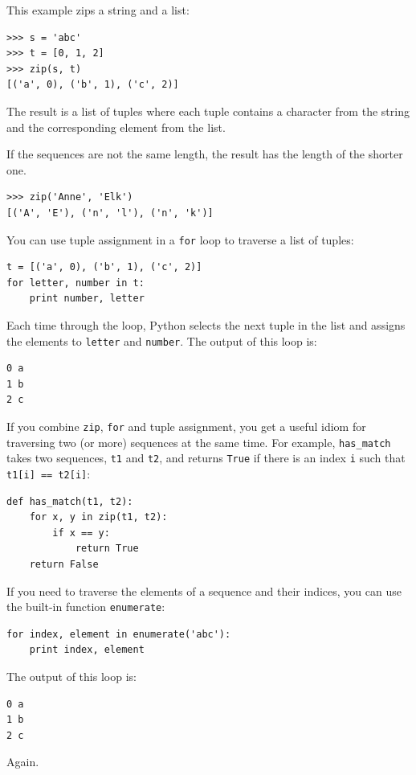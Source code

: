 \documentclass[10pt]{book}
\begin{document}
\begin{CJK}{UTF8}{gbsn}
This example zips a string and a list:

\begin{verbatim}
>>> s = 'abc'
>>> t = [0, 1, 2]
>>> zip(s, t)
[('a', 0), ('b', 1), ('c', 2)]
\end{verbatim}
%
The result is a list of tuples where each tuple contains
a character from the string and the corresponding element from
the list.

If the sequences are not the same length, the result has the
length of the shorter one.

\begin{verbatim}
>>> zip('Anne', 'Elk')
[('A', 'E'), ('n', 'l'), ('n', 'k')]
\end{verbatim}
%
You can use tuple assignment in a {\tt for} loop to traverse a list of
tuples:

\begin{verbatim}
t = [('a', 0), ('b', 1), ('c', 2)]
for letter, number in t:
    print number, letter
\end{verbatim}
%
Each time through the loop, Python selects the next tuple in
the list and assigns the elements to {\tt letter} and 
{\tt number}.  The output of this loop is:

\begin{verbatim}
0 a
1 b
2 c
\end{verbatim}
%
If you combine {\tt zip}, {\tt for} and tuple assignment, you get a
useful idiom for traversing two (or more) sequences at the same
time.  For example, \verb"has_match" takes two sequences, {\tt t1} and
{\tt t2}, and returns {\tt True} if there is an index {\tt i}
such that {\tt t1[i] == t2[i]}:

\begin{verbatim}
def has_match(t1, t2):
    for x, y in zip(t1, t2):
        if x == y:
            return True
    return False
\end{verbatim}
%
If you need to traverse the elements of a sequence and their
indices, you can use the built-in function {\tt enumerate}:

\begin{verbatim}
for index, element in enumerate('abc'):
    print index, element
\end{verbatim}
%
The output of this loop is:

\begin{verbatim}
0 a
1 b
2 c
\end{verbatim}
%
Again.



\end{CJK}
\end{document}
